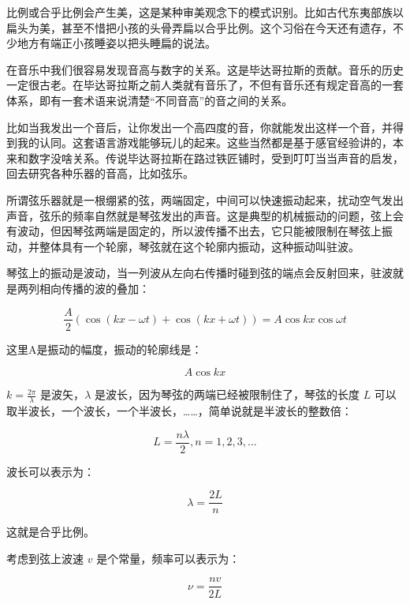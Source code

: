 比例或合乎比例会产生美，这是某种审美观念下的模式识别。比如古代东夷部族以扁头为美，甚至不惜把小孩的头骨弄扁以合乎比例。这个习俗在今天还有遗存，不少地方有端正小孩睡姿以把头睡扁的说法。

在音乐中我们很容易发现音高与数字的关系。这是毕达哥拉斯的贡献。音乐的历史一定很古老。在毕达哥拉斯之前人类就有音乐了，不但有音乐还有规定音高的一套体系，即有一套术语来说清楚“不同音高”的音之间的关系。

比如当我发出一个音后，让你发出一个高四度的音，你就能发出这样一个音，并得到我的认同。这套语言游戏能够玩儿的起来。这些当然都是基于感官经验讲的，本来和数字没啥关系。传说毕达哥拉斯在路过铁匠铺时，受到叮叮当当声音的启发，回去研究各种乐器的音高，比如弦乐。

所谓弦乐器就是一根绷紧的弦，两端固定，中间可以快速振动起来，扰动空气发出声音，弦乐的频率自然就是琴弦发出的声音。这是典型的机械振动的问题，弦上会有波动，但因琴弦两端是固定的，所以波传播不出去，它只能被限制在琴弦上振动，并整体具有一个轮廓，琴弦就在这个轮廓内振动，这种振动叫驻波。

琴弦上的振动是波动，当一列波从左向右传播时碰到弦的端点会反射回来，驻波就是两列相向传播的波的叠加：

\begin{equation}
\frac{A}{2} \left( \cos ( kx - \omega t ) + \cos ( kx + \omega t ) \right) = A \cos kx \cos \omega t
\end{equation}

这里A是振动的幅度，振动的轮廓线是：

\begin{equation}
A \cos kx 
\end{equation}

$k = \frac{2 \pi}{\lambda}$ 是波矢，$\lambda$ 是波长，因为琴弦的两端已经被限制住了，琴弦的长度 $L$ 可以取半波长，一个波长，一个半波长，……，简单说就是半波长的整数倍：

\begin{equation}
L = \frac{n \lambda}{2}, n = 1, 2, 3, ...
\end{equation}

波长可以表示为：

\begin{equation}
\lambda = \frac{2L}{n}
\end{equation}

这就是合乎比例。

考虑到弦上波速 $v$ 是个常量，频率可以表示为：

\begin{equation}
\nu = \frac{n v}{2 L }
\end{equation}

